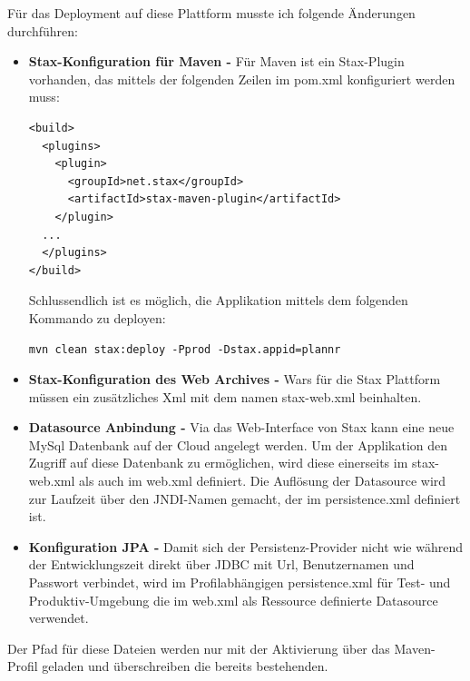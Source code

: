 F\"ur das Deployment auf diese Plattform musste ich folgende \"Anderungen durchf\"uhren:
\begin{itemize}
\item \textbf{Stax-Konfiguration f\"ur Maven - } F\"ur Maven ist ein Stax-Plugin vorhanden, das mittels der folgenden Zeilen im pom.xml konfiguriert werden muss: 

\begin{lstlisting}[caption=Konfiguration Maven mit Stax]
<build>
  <plugins>
    <plugin>
      <groupId>net.stax</groupId>
      <artifactId>stax-maven-plugin</artifactId>
    </plugin>
  ...
  </plugins>
</build>
\end{lstlisting}
Schlussendlich ist es m\"oglich, die Applikation mittels dem folgenden Kommando zu deployen:
\begin{lstlisting}[caption=Befehl Deployment Stax]
mvn clean stax:deploy -Pprod -Dstax.appid=plannr
\end{lstlisting}
\item \textbf{Stax-Konfiguration des Web Archives - } Wars f\"ur die Stax Plattform m\"ussen ein zus\"atzliches Xml mit dem namen stax-web.xml beinhalten. 
\item \textbf{Datasource Anbindung - } Via das Web-Interface von Stax kann eine neue MySql Datenbank auf der Cloud angelegt werden. Um der Applikation den Zugriff auf diese Datenbank zu erm\"oglichen, wird diese einerseits im stax-web.xml als auch im web.xml definiert. Die Aufl\"osung der Datasource wird zur Laufzeit \"uber den JNDI-Namen gemacht, der im persistence.xml definiert ist.
\item \textbf{Konfiguration JPA -} Damit sich der Persistenz-Provider nicht wie w\"ahrend der Entwicklungszeit direkt \"uber JDBC mit Url, Benutzernamen und Passwort verbindet, wird im Profilabh\"angigen persistence.xml f\"ur Test- und Produktiv-Umgebung die im web.xml als Ressource definierte Datasource verwendet. 
\end{itemize} 

Der Pfad f\"ur diese Dateien werden nur mit der Aktivierung \"uber das Maven-Profil geladen und \"uberschreiben die bereits bestehenden.








